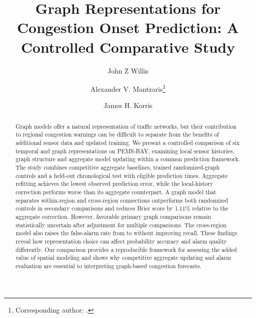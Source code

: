 \documentclass{llncs}
\begin{document}
\title{Graph Representations for Congestion Onset Prediction: A Controlled Comparative Study}
\author{John Z Willis \and
Alexander V. Mantzaris\fnmsep\thanks{Corresponding author: .} \and
James H. Korris}
\maketitle
\begin{abstract}
Graph models offer a natural representation of traffic networks, but their contribution to regional congestion warnings can be difficult to separate from the benefits of additional sensor data and updated training. We present a controlled comparison of six temporal and graph representations on PEMS-BAY, examining local sensor histories, graph structure and aggregate model updating within a common prediction framework. The study combines competitive aggregate baselines, trained randomized-graph controls and a held-out chronological test with \TestOnsetN{} eligible prediction times. Aggregate refitting achieves the lowest observed prediction error, while the local-history correction performs worse than its aggregate counterpart. A graph model that separates within-region and cross-region connections outperforms both randomized controls in secondary comparisons and reduces Brier score by 1.11\% relative to the aggregate correction. However, favorable primary graph comparisons remain statistically uncertain after adjustment for multiple comparisons. The cross-region model also raises the false-alarm rate from \TestFprB{} to \TestFprE{} without improving recall. These findings reveal how representation choice can affect probability accuracy and alarm quality differently. Our comparison provides a reproducible framework for assessing the added value of spatial modeling and shows why competitive aggregate updating and alarm evaluation are essential to interpreting graph-based congestion forecasts.
\end{abstract}
\end{document}
